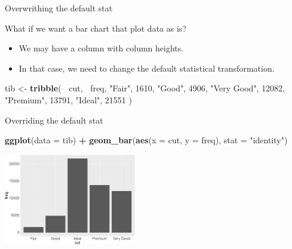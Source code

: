 \documentclass[ignorenonframetext,]{beamer}
\newenvironment{Shaded}{\begin{snugshade}}{\end{snugshade}}
\newcommand{\DataTypeTok}[1]{\textcolor[rgb]{0.13,0.29,0.53}{#1}}
\newcommand{\DecValTok}[1]{\textcolor[rgb]{0.00,0.00,0.81}{#1}}
\newcommand{\KeywordTok}[1]{\textcolor[rgb]{0.13,0.29,0.53}{\textbf{#1}}}
\newcommand{\NormalTok}[1]{#1}
\newcommand{\OperatorTok}[1]{\textcolor[rgb]{0.81,0.36,0.00}{\textbf{#1}}}
\newcommand{\StringTok}[1]{\textcolor[rgb]{0.31,0.60,0.02}{#1}}
\providecommand{\tightlist}{%
  \setlength{\itemsep}{0pt}\setlength{\parskip}{0pt}}
\begin{document}
\begin{frame}[fragile]{Overwrithing the default stat}
\protect\hypertarget{overwrithing-the-default-stat}{}

What if we want a bar chart that plot data as is?

\begin{itemize}
\tightlist
\item
  We may have a column with column heights.
\item
  In that case, we need to change the default statistical
  transformation.
\end{itemize}

\begin{Shaded}
\begin{Highlighting}[]
\NormalTok{tib <-}\StringTok{ }\KeywordTok{tribble}\NormalTok{(}
  \OperatorTok{~}\NormalTok{cut,         }\OperatorTok{~}\NormalTok{freq,}
  \StringTok{"Fair"}\NormalTok{,       }\DecValTok{1610}\NormalTok{,}
  \StringTok{"Good"}\NormalTok{,       }\DecValTok{4906}\NormalTok{,}
  \StringTok{"Very Good"}\NormalTok{,  }\DecValTok{12082}\NormalTok{,}
  \StringTok{"Premium"}\NormalTok{,    }\DecValTok{13791}\NormalTok{,}
  \StringTok{"Ideal"}\NormalTok{,      }\DecValTok{21551}
\NormalTok{)}
\end{Highlighting}
\end{Shaded}

\end{frame}

\begin{frame}[fragile]{Overriding the default stat}
\protect\hypertarget{overriding-the-default-stat}{}

\begin{Shaded}
\begin{Highlighting}[]
\KeywordTok{ggplot}\NormalTok{(}\DataTypeTok{data =}\NormalTok{ tib) }\OperatorTok{+}
\StringTok{  }\KeywordTok{geom_bar}\NormalTok{(}\KeywordTok{aes}\NormalTok{(}\DataTypeTok{x =}\NormalTok{ cut, }\DataTypeTok{y =}\NormalTok{ freq),}
    \DataTypeTok{stat =} \StringTok{"identity"}\NormalTok{)}
\end{Highlighting}
\end{Shaded}

\begin{center}\includegraphics[height=150px]{data-visualization_files/figure-beamer/unnamed-chunk-115-1} \end{center}

\end{frame}
\end{document}

